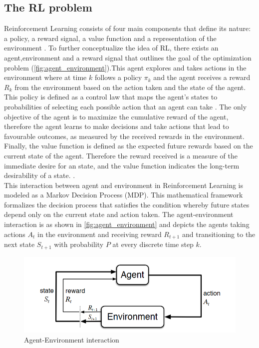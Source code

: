 \subsection{The RL problem}
Reinforcement Learning consists of four main components that define its nature: a policy, a reward signal, a value function and a representation of the environment \cite{suttonReinforcementLearningIntroduction2014}. To further conceptualize the idea of RL, there exists an agent,environment and a reward signal that outlines the goal of the optimization problem (\autoref{fig:agent_environment}).This agent explores and takes actions in the environment where at time $k$ follows a policy $\pi_{k}$ and the agent receives a reward $R_{k}$ from the environment based on the action taken and the state of the agent. This policy is defined as a control law that maps the agent's states to probabilities of selecting each possible action that an agent can take \cite{suttonReinforcementLearningIntroduction2014}. The only objective of the agent is to maximize the cumulative reward of the agent, therefore the agent learns to make decisions and take actions that lead to favourable outcomes, as measured by the received rewards in the environment. Finally, the value function is defined as the expected future rewards based on the current state of the agent. Therefore the reward received is a measure of the immediate desire for an state, and the value function indicates the long-term desirability of a state. \cite{suttonReinforcementLearningIntroduction2014}.\\

This interaction between agent and environment in Reinforcement Learning is modeled as a Markov Decision Process (MDP). This mathematical framework formalizes the decision process that satisfies the condition whereby future states depend only on the current state and action taken. The agent-environment interaction is as shown in \autoref{fig:agent_environment} and depicts the agents taking actions $A_t$ in the environment and receiving reward $R_{t+1}$ and transitioning to the next state $S_{t+1}$ with probability $P$ at every discrete time step $k$.



\begin{figure}[h]
	\centering
	\includegraphics[width=0.75\linewidth]{figures/agent-environment.png}
	\caption{Agent-Environment interaction \cite{suttonReinforcementLearningIntroduction2014}}
	\label{fig:agent_environment}
\end{figure}

